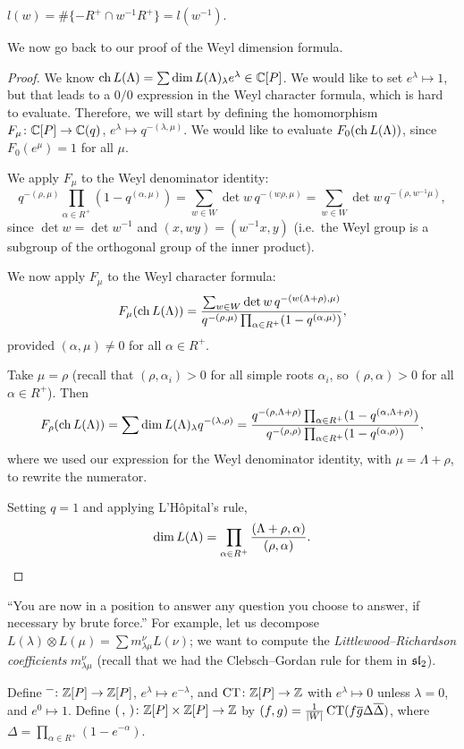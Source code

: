 \begin{exercise}
$l(w) = \#\{-R^+ \cap w^{-1}R^+\} = l(w^{-1})$.
\end{exercise}

We now go back to our proof of the Weyl dimension formula.

\begin{proof}
We know $\ch L(\Lambda) = \sum \dim L(\Lambda)_\lambda e^\lambda \in \C[P]$. We
would like to set $e^\lambda \mapsto 1$, but that leads to a $0/0$ expression
in the Weyl character formula, which is hard to evaluate. Therefore, we will
start by defining the homomorphism $F_\mu\colon \C[P] \to \C(q)$,
$e^\lambda \mapsto q^{-(\lambda, \mu)}$. We would like to evaluate
$F_0(\ch L(\Lambda))$, since $F_0(e^\mu) = 1$ for all $\mu$.

We apply $F_\mu$ to the Weyl denominator identity:
\[
  q^{-(\rho, \mu)}\prod_{\alpha \in R^+} (1 - q^{(\alpha, \mu)})
  = \sum_{w \in W} \det w \, q^{-(w\rho, \mu)}
  = \sum_{w \in W} \det w \, q^{-(\rho, w^{-1}\mu)},
\]
since $\det w = \det w^{-1}$ and $(x, wy) = (w^{-1}x, y)$ (i.e.\ the Weyl group
is a subgroup of the orthogonal group of the inner product).

We now apply $F_\mu$ to the Weyl character formula:
\[
  F_\mu(\ch L(\Lambda))
  = \frac{\sum_{w \in W} \det w \, q^{-(w(\Lambda+\rho), \mu)}}{q^{-(\rho, \mu)}\prod_{\alpha \in R^+} (1 - q^{(\alpha, \mu)})},
\]
provided $(\alpha, \mu) \neq 0$ for all $\alpha \in R^+$.

Take $\mu = \rho$ (recall that $(\rho, \alpha_i) > 0$ for all simple roots
$\alpha_i$, so $(\rho, \alpha) > 0$ for all $\alpha \in R^+$). Then
\[
  F_\rho(\ch L(\Lambda)) = \sum \dim L(\Lambda)_\lambda q^{-(\lambda, \rho)}
  = \frac{q^{-(\rho, \Lambda+\rho)}\prod_{\alpha \in R^+} (1 - q^{(\alpha, \Lambda+\rho)})}
         {q^{-(\rho, \rho)}\prod_{\alpha \in R^+} (1 - q^{(\alpha, \rho)})},
\]
where we used our expression for the Weyl denominator identity, with
$\mu = \Lambda + \rho$, to rewrite the numerator.

Setting $q = 1$ and applying L'H\^opital's rule,
\[
  \dim L(\Lambda) = \prod_{\alpha \in R^+} \frac{(\Lambda + \rho, \alpha)}{(\rho, \alpha)}. \qedhere
\]
\end{proof}

\begin{remark}
``You are now in a position to answer any question you choose to answer, if
necessary by brute force.'' For example, let us decompose
$L(\lambda) \otimes L(\mu) = \sum m_{\lambda\mu}^\nu L(\nu)$; we want to
compute the \emph{Littlewood--Richardson coefficients} $m_{\lambda\mu}^\nu$
(recall that we had the Clebsch--Gordan rule for them in $\sl_2$).

Define $\overline{\phantom{x}}\colon \Z[P] \to \Z[P]$, $e^\lambda \mapsto e^{-\lambda}$,
and $\CT\colon \Z[P] \to \Z$ with $e^\lambda \mapsto 0$ unless $\lambda = 0$,
and $e^0 \mapsto 1$. Define $(\,,\,)\colon \Z[P] \times \Z[P] \to \Z$ by
$(f, g) = \frac{1}{|W|}\CT(f\overline{g}\Delta\overline{\Delta})$, where
$\Delta = \prod_{\alpha \in R^+} (1 - e^{-\alpha})$.
\end{remark}

